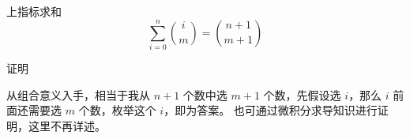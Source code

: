 \documentclass[UTF8]{beamer}
\begin{document}
    \begin{frame}
      \begin{block}{上指标求和}
        $$
        \sum\limits_{i=0}^{n}{i \choose m}={n+1 \choose m+1}
        $$

        证明

        从组合意义入手，相当于我从 \(n+1\) 个数中选 \(m+1\) 个数，先假设选
        \(i\)，那么 \(i\) 前面还需要选 \(m\) 个数，枚举这个 \(i\)，即为答案。
        也可通过微积分求导知识进行证明，这里不再详述。
      \end{block}
    \end{frame}

    
\end{document}
